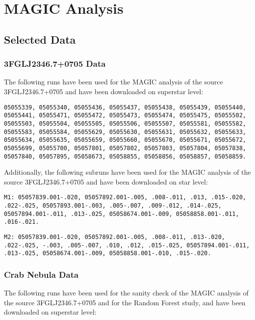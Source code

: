\chapter{MAGIC Analysis}
\label{app:magic}

\section{Selected Data}
\label{sec:selected_data}

\subsection*{3FGLJ2346.7+0705 Data}

The following runs have been used for the MAGIC analysis of the source 3FGLJ2346.7+0705 and have been downloaded on superstar level:

\texttt{05055339, 05055340, 05055436, 05055437, 05055438, 05055439, 05055440, 05055441, 05055471, 05055472, 05055473, 05055474, 05055475, 05055502, 05055503, 05055504, 05055505, 05055506, 05055507, 05055581, 05055582, 05055583, 05055584, 05055629, 05055630, 05055631, 05055632, 05055633, 05055634, 05055635, 05055659, 05055660, 05055670, 05055671, 05055672, 05055699, 05055700, 05057801, 05057802, 05057803, 05057804, 05057838, 05057840, 05057895, 05058673, 05058855, 05058856, 05058857, 05058859.}

\vspace{0.3cm}

Additionally, the following subruns have been used for the MAGIC analysis of the source 3FGLJ2346.7+0705 and have been downloaded on star level:

\texttt{M1: 05057839.001-.020, 05057892.001-.005, .008-.011, .013, .015-.020, .022-.025, 05057893.001-.003, .005-.007, .009-.012, .014-.025, 05057894.001-.011, .013-.025, 05058674.001-.009, 05058858.001-.011, .016-.021.}

\texttt{M2: 05057839.001-.020, 05057892.001-.005, .008-.011, .013-.020, .022-.025, -.003, .005-.007, .010, .012, .015-.025, 05057894.001-.011, .013-.025, 05058674.001-.009, 05058858.001-.010, .015-.020.}



\subsection*{Crab Nebula Data}

The following runs have been used for the sanity check of the MAGIC analysis of the source 3FGLJ2346.7+0705 and for the Random Forest study, and have been downloaded on superstar level:

